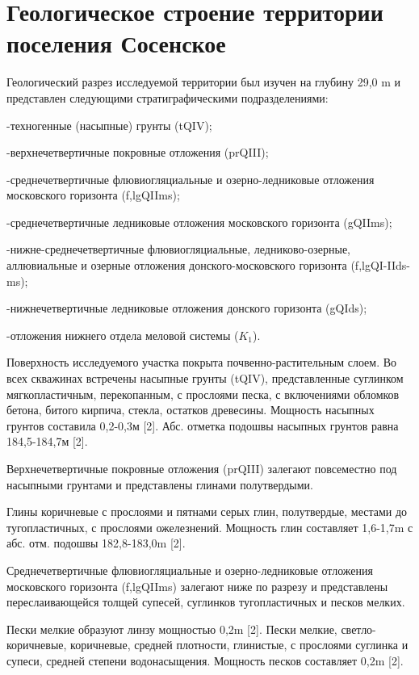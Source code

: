 \chapter*{Геологическое строение территории поселения Сосенское} 

Геологический разрез исследуемой территории был изучен на глубину 29,0 \si{\meter} и представлен следующими стратиграфическими подразделениями:

-техногенные (насыпные) грунты (tQIV);

-верхнечетвертичные покровные отложения (prQIII);

-среднечетвертичные флювиогляциальные и озерно-ледниковые отложения московского горизонта (f,lgQIIms);

-среднечетвертичные ледниковые отложения московского горизонта (gQIIms);

-нижне-среднечетвертичные флювиогляциальные, ледниково-озерные, аллювиальные и озерные отложения донского-московского горизонта (f,lgQI-IIds-ms);

-нижнечетвертичные ледниковые отложения донского горизонта (gQIds);

-отложения нижнего отдела меловой системы ($K_1$).

Поверхность исследуемого участка покрыта почвенно-растительным слоем. Во всех скважинах встречены насыпные грунты (tQIV), представленные суглинком мягкопластичным, перекопанным, с прослоями песка, с включениями обломков бетона, битого кирпича, стекла, остатков древесины. Мощность насыпных грунтов составила 0,2-0,3м [2]. Абс. отметка подошвы насыпных грунтов равна 184,5-184,7м [2].

Верхнечетвертичные покровные отложения (prQIII) залегают повсеместно под насыпными грунтами и представлены глинами полутвердыми.

Глины коричневые с прослоями и пятнами серых глин, полутвердые, местами до тугопластичных, с прослоями ожелезнений. Мощность глин составляет 1,6-1,7\si{\meter} с абс. отм. подошвы 182,8-183,0\si{\meter} [2].

Среднечетвертичные флювиогляциальные и озерно-ледниковые отложения московского горизонта (f,lgQIIms) залегают ниже по разрезу и представлены переслаивающейся толщей супесей, суглинков тугопластичных и песков мелких.

Пески мелкие образуют линзу мощностью 0,2\si{\meter} [2]. Пески мелкие, светло-коричневые, коричневые, средней плотности, глинистые, с прослоями суглинка и супеси, средней степени водонасыщения. Мощность песков составляет 0,2\si{\meter} [2].

